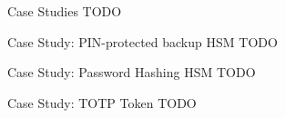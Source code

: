 \begin{frame}{Case Studies}
  TODO
\end{frame}

\begin{frame}{Case Study: PIN-protected backup HSM}
  TODO
\end{frame}

\begin{frame}{Case Study: Password Hashing HSM}
  TODO
\end{frame}

\begin{frame}{Case Study: TOTP Token}
  TODO
\end{frame}




